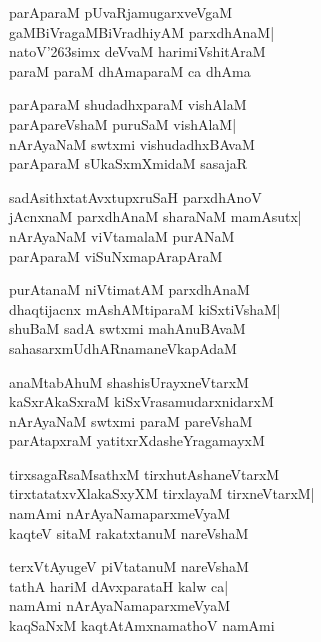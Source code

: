 \documentclass[twoside,12pt,openright]{book}
\def\S{\char'263}
\newcounter{shloka}[chapter]
\begin{document}
\begin{shloka}%
parAparaM pUvaRjamugarxveVgaM\\
gaMBiVragaMBiVradhiyAM parxdhAnaM|\\
natoV\S simx deVvaM harimiVshitAraM\\
paraM paraM dhAmaparaM ca dhAma
\end{shloka}

\begin{shloka}%
parAparaM shudadhxparaM vishAlaM\\
parApareVshaM puruSaM vishAlaM|\\
nArAyaNaM swtxmi vishudadhxBAvaM\\
parAparaM sUkaSxmXmidaM sasajaR
\end{shloka}

\begin{shloka}%
sadAsithxtatAvxtupxruSaH parxdhAnoV\\
jAcnxnaM parxdhAnaM sharaNaM mamAsutx|\\
nArAyaNaM viVtamalaM purANaM\\
parAparaM viSuNxmapArapAraM
\end{shloka}

\begin{shloka}%
purAtanaM niVtimatAM parxdhAnaM\\
dhaqtijacnx mAshAMtiparaM kiSxtiVshaM|\\
shuBaM sadA swtxmi mahAnuBAvaM\\
sahasarxmUdhARnamaneVkapAdaM
\end{shloka}

\begin{shloka}%
anaMtabAhuM shashisUrayxneVtarxM\\
kaSxrAkaSxraM kiSxVrasamudarxnidarxM\\
nArAyaNaM swtxmi paraM pareVshaM\\
parAtapxraM yatitxrXdasheYragamayxM
\end{shloka}

\begin{shloka}%
tirxsagaRsaMsathxM tirxhutAshaneVtarxM\\
tirxtatatxvXlakaSxyXM tirxlayaM tirxneVtarxM|\\
namAmi nArAyaNamaparxmeVyaM\\
kaqteV sitaM rakatxtanuM nareVshaM
\end{shloka}

\begin{shloka}%
terxVtAyugeV piVtatanuM nareVshaM\\
tathA hariM dAvxparataH kalw ca|\\
namAmi nArAyaNamaparxmeVyaM\\
kaqSaNxM kaqtAtAmxnamathoV namAmi
\end{shloka}
\end{document}
